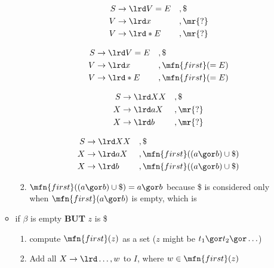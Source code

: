 \begin{itemize}
\begin{itemize}[leftmargin=3em]
\begin{enumerate}
      \begin{minipage}{.3\linewidth}
        \begin{align*}
          S&\to \lrd V = E &&,\$ \\
          V&\to \lrd x     &&,\mr{?}  \\
          V&\to \lrd *E    &&,\mr{?}
        \end{align*}
      \end{minipage}
      \begin{minipage}{.7\linewidth}
        \begin{align*}
          S&\to \lrd V = E& &,\$ \\
          V&\to \lrd x    & &,\mfn{first}(=E)  \\
          V&\to \lrd *E   & &,\mfn{first}(=E)
        \end{align*}
      \end{minipage}
      \begin{minipage}{.2\linewidth}
        \begin{align*}
          S&\to \lrd XX &&,\$ \\
          X&\to \lrd aX &&,\mr{?}  \\
          X&\to \lrd b  &&,\mr{?}
        \end{align*}
      \end{minipage}
      \begin{minipage}{.8\linewidth}
        \begin{align*}
          S&\to \lrd XX    &&,\$ \\
          X&\to \lrd aX    &&,\mfn{first}((a\gor b)\cup\$)  \\
          X&\to \lrd b     &&,\mfn{first}((a\gor b)\cup\$)
        \end{align*}
      \end{minipage}
      \item $\mfn{first}((a\gor b)\cup\$) = a\gor b$ because \$ is considered only when $\mfn{first}(a\gor b)$ is empty, which is 
    \end{enumerate}
  \item if $\beta$ is empty \textbf{BUT} $z$ is  \$
    \begin{enumerate}
    \item compute $\mfn{first}(z)$ as a set ($z$ might be $t_1\gor t_2\gor\ldots$)
    \item Add all $X\to\lrd \ldots, w$ to $I$, where $w \in \mfn{first}(z)$


\end{enumerate}
\end{itemize}
\end{itemize}
